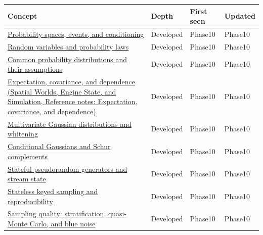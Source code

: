 {\def\LTcaptype{none} %
\begin{longtable}[]{@{}
  >{\raggedright\arraybackslash}p{}
  >{\raggedright\arraybackslash}p{}
  >{\raggedright\arraybackslash}p{}
  >{\raggedright\arraybackslash}p{}@{}}
\toprule\noalign{}
\begin{minipage}[b]{\linewidth}\raggedright
Concept
\end{minipage} & \begin{minipage}[b]{\linewidth}\raggedright
Depth
\end{minipage} & \begin{minipage}[b]{\linewidth}\raggedright
First seen
\end{minipage} & \begin{minipage}[b]{\linewidth}\raggedright
Updated
\end{minipage} \\
\midrule\noalign{}
\endhead
\bottomrule\noalign{}
\endlastfoot
\hyperref[appendix-f1ef323f6ed7]{Probability spaces, events, and conditioning} & Developed & Phase10 & Phase10 \\
\hyperref[appendix-4d0203f7944f]{Random variables and probability laws} & Developed & Phase10 & Phase10 \\
\hyperref[appendix-a2360b435383]{Common probability distributions and their assumptions} & Developed & Phase10 & Phase10 \\
\href{../05-Spatial-Worlds-Engine-State-and-Simulation/main.pdf\#nameddest=appendix-54c383df9992}{Expectation, covariance, and dependence (Spatial Worlds, Engine State, and Simulation, Reference notes: Expectation, covariance, and dependence)} & Developed & Phase10 & Phase10 \\
\hyperref[appendix-12bbe185dbe5]{Multivariate Gaussian distributions and whitening} & Developed & Phase10 & Phase10 \\
\hyperref[appendix-f0437ea55a47]{Conditional Gaussians and Schur complements} & Developed & Phase10 & Phase10 \\
\hyperref[appendix-e0f7c7e08f3a]{Stateful pseudorandom generators and stream state} & Developed & Phase10 & Phase10 \\
\hyperref[appendix-daaf25bfd3a0]{Stateless keyed sampling and reproducibility} & Developed & Phase10 & Phase10 \\
\hyperref[appendix-9f693ffd82bc]{Sampling quality: stratification, quasi-Monte Carlo, and blue noise} & Developed & Phase10 & Phase10 \\

\end{longtable}}
